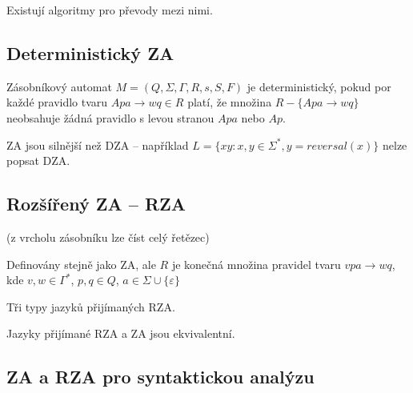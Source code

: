\documentclass[a4paper, 11pt]{report}
\begin{document}
Existují algoritmy pro převody mezi nimi.

\subsection{Deterministický ZA}

Zásobníkový automat $M = (Q, \Sigma, \Gamma, R, s, S, F)$ je deterministický, pokud por každé pravidlo tvaru $Apa \to wq \in R$ platí, že množina $R - \{ Apa \to wq \}$ neobsahuje žádná pravidlo s levou stranou $Apa$ nebo $Ap$.

ZA jsou silnější než DZA -- například $L = \{ xy: x,y \in \Sigma^*, y = reversal(x) \}$ nelze popsat DZA.

\subsection{Rozšířený ZA -- RZA}

(z vrcholu zásobníku lze číst celý řetězec)

Definovány stejně jako ZA, ale $R$ je konečná množina pravidel tvaru $vpa \to wq$, kde $v,w \in \Gamma^*$, $p,q \in Q$, $a \in \Sigma \cup \{\varepsilon\}$

Tři typy jazyků přijímaných RZA.

Jazyky přijímané RZA a ZA jsou ekvivalentní.

\subsection{ZA a RZA pro syntaktickou analýzu}
\end{document}
